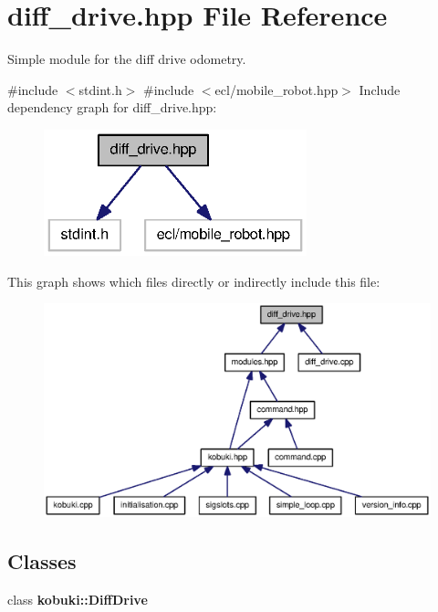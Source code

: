 \section{diff\-\_\-drive.\-hpp \-File \-Reference}
\label{diff__drive_8hpp}


\-Simple module for the diff drive odometry.  


{\ttfamily \#include $<$stdint.\-h$>$}\*
{\ttfamily \#include $<$ecl/mobile\-\_\-robot.\-hpp$>$}\*
\-Include dependency graph for diff\-\_\-drive.\-hpp\-:
\nopagebreak
\begin{figure}[H]
\begin{center}
\leavevmode
\includegraphics[width=216pt]{diff__drive_8hpp__incl}
\end{center}
\end{figure}
\-This graph shows which files directly or indirectly include this file\-:
\nopagebreak
\begin{figure}[H]
\begin{center}
\leavevmode
\includegraphics[width=350pt]{diff__drive_8hpp__dep__incl}
\end{center}
\end{figure}
\subsection*{\-Classes}
\begin{DoxyCompactItemize}
\item 
class {\bf kobuki\-::\-Diff\-Drive}
\end{DoxyCompactItemize}
